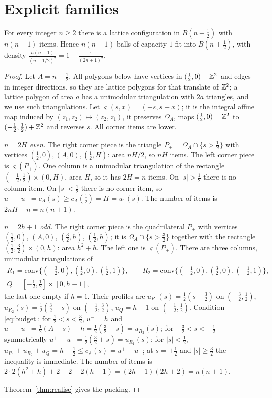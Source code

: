 \documentclass[11pt]{amsart}
\begin{document}
\section{Explicit families}\label{sec:families}

\begin{theorem}\label{thm:family}
For every integer $n\ge2$ there is a lattice configuration in $B(n+\frac12)$ with $n(n+1)$ items. Hence
$n(n+1)$ balls of capacity $1$ fit into $B(n+\frac12)$, with density
$\frac{n(n+1)}{(n+1/2)^2}=1-\frac1{(2n+1)^2}$.
\end{theorem}

\begin{proof}
Let $A=n+\frac12$. All polygons below have vertices in $(\frac12,0)+\mathbb{Z}^2$ and edges in integer directions, so they
are lattice polygons for that translate of $\mathbb{Z}^2$; a lattice polygon of area $a$ has a unimodular triangulation
with $2a$ triangles, and we use such triangulations. Let $\varsigma(s,x)=(-s,s+x)$; it is the integral affine map
induced by $(z_1,z_2)\mapsto(z_2,z_1)$, it preserves $\Omega_A$, maps $(\frac12,0)+\mathbb{Z}^2$ to $(-\frac12,\frac12)+\mathbb{Z}^2$
and reverses $s$. All corner items are lower.

\emph{$n=2H$ even.} The right corner piece is the triangle $P_+=\Omega_A\cap\{s>\frac12\}$ with vertices
$(\frac12,0),(A,0),(\frac12,H)$: area $nH/2$, so $nH$ items. The left corner piece is $\varsigma(P_+)$. One column
is a unimodular triangulation of the rectangle $(-\frac12,\frac12)\times(0,H)$, area $H$, so it has $2H=n$ items. On $|s|>\frac12$ there is no column
item. On $|s|<\frac12$ there is no corner item, so $u^+-u^-=c_A(s)\ge c_A(\frac12)=H=u_1(s)$. The number of items
is $2nH+n=n(n+1)$.

\emph{$n=2h+1$ odd.} The right corner piece is the quadrilateral $P_+$ with vertices $(\frac12,0)$, $(A,0)$,
$(\frac32,h)$, $(\frac12,h)$; it is $\Omega_A\cap\{s>\frac32\}$ together with the rectangle
$(\frac12,\frac32)\times(0,h)$: area $h^2+h$. The left one is $\varsigma(P_+)$. There are three columns,
unimodular triangulations of
\begin{gather*}
R_1=\mathrm{conv}\{(-\tfrac32,0),(\tfrac12,0),(\tfrac12,1)\},\qquad
R_2=\mathrm{conv}\{(-\tfrac12,0),(\tfrac32,0),(-\tfrac12,1)\},\\
Q=[-\tfrac12,\tfrac12]\times[0,h-1],
\end{gather*}
the last one empty if $h=1$. Their profiles are $u_{R_1}(s)=\frac12(s+\frac32)$ on $(-\frac32,\frac12)$,
$u_{R_2}(s)=\frac12(\frac32-s)$ on $(-\frac12,\frac32)$, $u_Q=h-1$ on $(-\frac12,\frac12)$. Condition
\eqref{eq:budget}: for $\frac12<s<\frac32$, $u^-=h$ and $u^+-u^-=\frac12(A-s)-h=\frac12(\frac32-s)=u_{R_2}(s)$; for
$-\frac32<s<-\frac12$ symmetrically $u^+-u^-=\frac12(\frac32+s)=u_{R_1}(s)$; for $|s|<\frac12$,
$u_{R_1}+u_{R_2}+u_Q=h+\frac12\le c_A(s)=u^+-u^-$; at $s=\pm\frac12$ and $|s|\ge\frac32$ the inequality is
immediate. The number of items is $2\cdot2(h^2+h)+2+2+2(h-1)=(2h+1)(2h+2)=n(n+1)$.

Theorem~\ref{thm:realise} gives the packing.
\end{proof}
\end{document}
